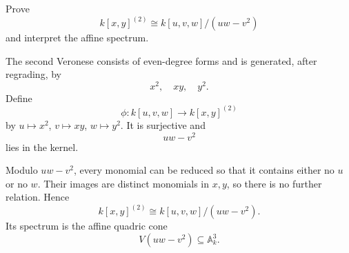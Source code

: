\begin{problem}\label{prob:vi34-08}
Prove
\[
k[x,y]^{(2)}\cong k[u,v,w]/(uw-v^2)
\]
and interpret the affine spectrum.
\end{problem}

\ifdefined\FullProblemDossiers
\begin{solution}
The second Veronese consists of even-degree forms and is generated, after regrading, by
\[
x^2,\quad xy,\quad y^2.
\]
Define
\[
\phi:k[u,v,w]\to k[x,y]^{(2)}
\]
by \(u\mapsto x^2\), \(v\mapsto xy\), \(w\mapsto y^2\). It is surjective and
\[
uw-v^2
\]
lies in the kernel.

Modulo \(uw-v^2\), every monomial can be reduced so that it contains either no \(u\) or no \(w\). Their images are
distinct monomials in \(x,y\), so there is no further relation. Hence
\[
\boxed{k[x,y]^{(2)}\cong k[u,v,w]/(uw-v^2)}.
\]
Its spectrum is the affine quadric cone
\[
V(uw-v^2)\subseteq\mathbb A^3_k.
\]
\end{solution}
\fi
